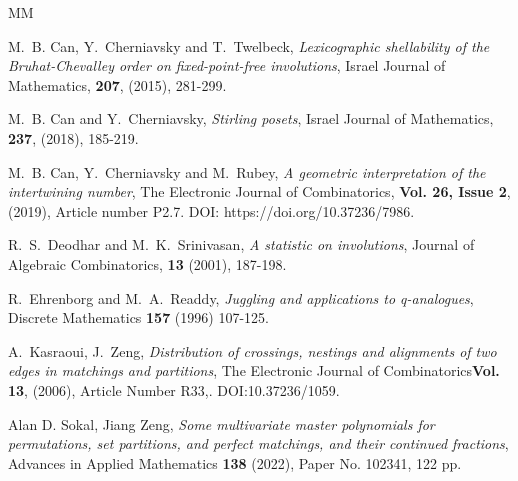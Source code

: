 \documentclass[11pt]{amsart}
\numberwithin{figure}{section}
\theoremstyle{plain}
\theoremstyle{definition}
\begin{document}
\begin{thebibliography}{MM}

M.\ B. Can, Y.\ Cherniavsky and T.\ Twelbeck, {\em Lexicographic shellability of the Bruhat-Chevalley order on fixed-point-free involutions}, Israel Journal of Mathematics, {\bf 207}, (2015), 281-299.
			
M.\ B. Can and Y.\ Cherniavsky, {\em Stirling posets}, Israel Journal of Mathematics, {\bf 237}, (2018), 185-219.
			
M.\ B. Can, Y.\ Cherniavsky and M.\ Rubey, {\em  A geometric interpretation of the intertwining number}, The Electronic Journal of Combinatorics, {\bf Vol. 26, Issue 2}, (2019), Article number P2.7. DOI: https://doi.org/10.37236/7986.
			
R.\ S.\ Deodhar and M.\ K.\ Srinivasan, {\em A statistic on involutions}, Journal of Algebraic Combinatorics, {\bf 13} (2001), 187-198.

R.\ Ehrenborg and M.\ A.\ Readdy, {\em Juggling and applications to q-analogues},
Discrete Mathematics {\bf 157} (1996) 107-125.

A.\ Kasraoui, J.\ Zeng,  {\em Distribution of crossings, nestings and alignments of
	two edges in matchings and partitions}, The Electronic Journal of Combinatorics{\bf Vol. 13}, (2006), Article Number R33,. DOI:10.37236/1059.

     Alan D. Sokal, Jiang Zeng, {\em Some multivariate master polynomials for permutations, set partitions,
 and perfect matchings, and their continued fractions}, Advances in Applied Mathematics {\bf 138} (2022), Paper No.
 102341, 122 pp.
\end{thebibliography}
\end{document}
